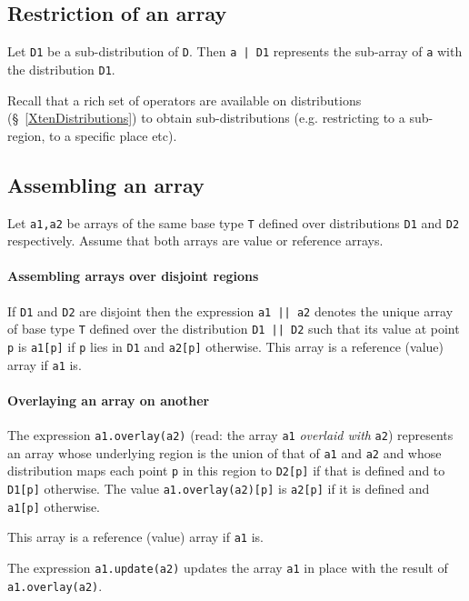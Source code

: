 \subsection{Restriction of an array}

Let {\tt D1} be a sub-distribution of {\tt D}. Then {\tt a | D1}
represents the sub-array of {\tt a} with the distribution {\tt D1}.

Recall that a rich set of operators are available on distributions
(\S~\ref{XtenDistributions}) to obtain sub-distributions
(e.g. restricting to a sub-region, to a specific place etc).

\subsection{Assembling an array}
Let {\tt a1,a2} be arrays of the same base type {\tt T} defined over
distributions {\tt D1} and {\tt D2} respectively. Assume that both
arrays are value or reference arrays. 
\paragraph{Assembling arrays over disjoint regions}

If {\tt D1} and {\tt D2} are disjoint then the expression {\tt a1 ||
a2} denotes the unique array of base type {\tt T} defined over the
distribution {\tt D1 || D2} such that its value at point {\tt p} is
{\tt a1[p]} if {\tt p} lies in {\tt D1} and {\tt a2[p]}
otherwise. This array is a reference (value) array if {\tt a1} is.

\paragraph{Overlaying an array on another}
The expression
{\tt a1.overlay(a2)} (read: the array {\tt a1} {\em overlaid with} {\tt a2})
represents an array whose underlying region is the union of that of
{\tt a1} and {\tt a2} and whose distribution maps each point {\tt p}
in this region to {\tt D2[p]} if that is defined and to {\tt D1[p]}
otherwise. The value {\tt a1.overlay(a2)[p]} is {\tt a2[p]} if it is defined and {\tt a1[p]} otherwise.

This array is a reference (value) array if {\tt a1} is.

The expression {\tt a1.update(a2)} updates the array {\tt a1} in place
with the result of {\tt a1.overlay(a2)}.

